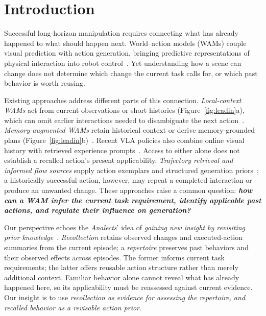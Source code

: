 \section{Introduction}
\label{sec:intro}

Successful long-horizon manipulation requires connecting what has already happened to what should happen next.
World--action models (WAMs) couple visual prediction with action generation, bringing predictive representations of physical interaction into robot control~\citep{kim2026cosmospolicy,li2026lingbotva,bi2025motus}.
Yet understanding how a scene can change does not determine which change the current task calls for, or which past behavior is worth reusing.

Existing approaches address different parts of this connection.
\emph{Local-context WAMs} act from current observations or short histories (Figure~\ref{fig:leadin}a), which can omit earlier interactions needed to disambiguate the next action~\citep{kaelbling1998pomdp,dai2026robomme,lei2026robomemarena}.
\emph{Memory-augmented WAMs} retain historical context or derive memory-grounded plans (Figure~\ref{fig:leadin}b)~\citep{yang2026memorywam,wang2026dimwam,zhao2026mapwam}.
Recent VLA policies also combine online visual history with retrieved experience prompts~\citep{zhou2026remembersmarter}.
Access to either alone does not establish a recalled action's present applicability.
\emph{Trajectory retrieval and informed flow sources} supply action exemplars and structured generation priors~\citep{park2026recap,kang2026warmprior,jia2026a2a,machado2026lafm}; a historically successful action, however, may repeat a completed interaction or produce an unwanted change.
These approaches raise a common question: \textbf{\emph{how can a WAM infer the current task requirement, identify applicable past actions, and regulate their influence on generation?}}


Our perspective echoes the \emph{Analects}' idea of \textit{gaining new insight by revisiting prior knowledge}~\citep[2.11]{confucius2002analects}.
\emph{Recollection} retains observed changes and executed-action summaries from the current episode; a \emph{repertoire} preserves past behaviors and their observed effects across episodes.
The former informs current task requirements; the latter offers reusable action structure rather than merely additional context.
Familiar behavior alone cannot reveal what has already happened here, so its applicability must be reassessed against current evidence.
Our insight is to use \emph{recollection as evidence for assessing the repertoire, and recalled behavior as a revisable action prior}.

